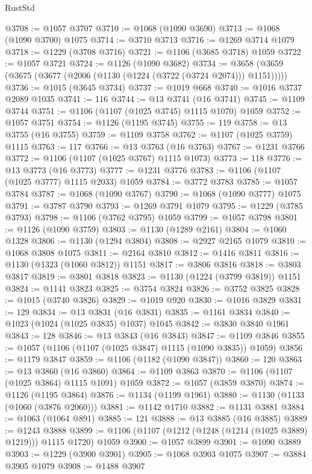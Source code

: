 \begin{lexlean}{RustStd}
\begin{coremodule}
@3708 := @1057 @3707
@3710 := @1068 (@1090 @3690)
@3713 := @1068 (@1090 @3700) @1075
@3714 := @3710 @3713
@3716 := @1269 @3714 @1079
@3718 := @1229 (@3708 @3716)
@3721 := @1106 (@3685 @3718) @1059
@3722 := @1057 @3721
@3724 := @1126 (@1090 @3682)
@3734 := @3658 (@3659 (@3675 (@3677 (@2006 (@1130 (@1224 (@3722 (@3724 @2074))) @1151)))))
@3736 := @1015 (@3645 @3734)
@3737 := @1019 @668
@3740 := @1016 @3737 @2089 @1035
@3741 := 116
@3744 := @13 @3741 (@16 @3741)
@3745 := @1109 @3744
@3751 := @1106 (@1107 (@1025 @3745) @1115 @1070) @1059
@3752 := @1057 @3751
@3754 := @1126 (@1195 @3745)
@3755 := 119
@3758 := @13 @3755 (@16 @3755)
@3759 := @1109 @3758
@3762 := @1107 (@1025 @3759) @1115
@3763 := 117
@3766 := @13 @3763 (@16 @3763)
@3767 := @1231 @3766
@3772 := @1106 (@1107 (@1025 @3767) @1115 @1073)
@3773 := 118
@3776 := @13 @3773 (@16 @3773)
@3777 := @1231 @3776
@3783 := @1106 (@1107 (@1025 @3777) @1115 @2033) @1059
@3784 := @3772 @3783
@3785 := @1057 @3784
@3787 := @1068 (@1090 @3767)
@3790 := @1068 (@1090 @3777) @1075
@3791 := @3787 @3790
@3793 := @1269 @3791 @1079
@3795 := @1229 (@3785 @3793)
@3798 := @1106 (@3762 @3795) @1059
@3799 := @1057 @3798
@3801 := @1126 (@1090 @3759)
@3803 := @1130 (@1289 @2161)
@3804 := @1060 @1328
@3806 := @1130 (@1294 @3804)
@3808 := @2927 @2165 @1079
@3810 := @1068 @3808 @1075
@3811 := @2164 @3810
@3812 := @1416 @3811
@3816 := @1130 (@1323 (@1060 @3812)) @1151
@3817 := @3806 @3816
@3818 := @3803 @3817
@3819 := @3801 @3818
@3823 := @1130 (@1224 (@3799 @3819)) @1151
@3824 := @1141 @3823
@3825 := @3754 @3824
@3826 := @3752 @3825
@3828 := @1015 (@3740 @3826)
@3829 := @1019 @920
@3830 := @1016 @3829
@3831 := 129
@3834 := @13 @3831 (@16 @3831)
@3835 := @1161 @3834
@3840 := @1023 (@1024 (@1025 @3835) @1037) @1045
@3842 := @3830 @3840 @1961
@3843 := 128
@3846 := @13 @3843 (@16 @3843)
@3847 := @1109 @3846
@3855 := @1057 (@1106 (@1107 (@1025 @3847) @1115 (@1090 @3835)) @1059)
@3856 := @1179 @3847
@3859 := @1106 (@1182 (@1090 @3847))
@3860 := 120
@3863 := @13 @3860 (@16 @3860)
@3864 := @1109 @3863
@3870 := @1106 (@1107 (@1025 @3864) @1115 @1091) @1059
@3872 := @1057 (@3859 @3870)
@3874 := @1126 (@1195 @3864)
@3876 := @1134 (@1199 @1961)
@3880 := @1130 (@1133 (@1060 (@3876 @2060)))
@3881 := @1142 @1710
@3882 := @1131 @3881
@3884 := @1063 (@1064 @891)
@3885 := 121
@3888 := @13 @3885 (@16 @3885)
@3889 := @1243 @3888
@3899 := @1106 (@1107 (@1212 (@1248 (@1214 (@1025 @3889) @1219))) @1115 @1720) @1059
@3900 := @1057 @3899
@3901 := @1090 @3889
@3903 := @1229 (@3900 @3901)
@3905 := @1068 @3903 @1075
@3907 := @3884 @3905 @1079
@3908 := @1488 @3907

\end{coremodule}
\end{lexlean}
